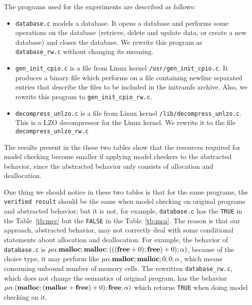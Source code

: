 The programs used for the experiments are described as follows:
\begin{itemize}
\item \texttt{database.c} models a database. It opens a database and
  performs some operations on the database (retrieve, delete and
  update data, or create a new database) and closes the database. We
  rewrite this program as \texttt{database\_rw.c} without changing its
  meaning.
\item \texttt{gen\_init\_cpio.c} is a file from Linux kernel
  \texttt{/usr/gen\_init\_cpio.c}. It produces a binary file which
  performs on a file containing newline separated entries that
  describe the files to be included in the initramfs archive. Also, we
  rewrite this program to \texttt{gen\_init\_cpio\_rw.c}.
  \item \texttt{decompress\_unlzo.c} is a file from Linux kernel
    \texttt{/lib/decompress\_unlzo.c}. This is a LZO decompressor for
    the Linux kernel. We rewrite it to the file
    \texttt{decompress\_unlzo\_rw.c}
\end{itemize}

The results present in the these two tables show that the
resources required for model checking become smaller if applying model
checkers to the abstracted behavior, since the abstracted behavior
only consists of allocation and deallocation.

One thing we should notice in these two tables is that for the same
programs, the \texttt{verified result} should be the same when model
checking on original programs and abstracted behavior; but it is not,
for example, \texttt{database.c} has the \texttt{TRUE} in the
Table~\ref{tb:mcc} but the \texttt{FALSE} in the
Table~\ref{tb:mca}. The reason is that our approach, abstracted
behavior, may not correctly deal with some conditional statements
about allocation and deallocation. For example, the behavior of
\texttt{database.c} is $\mu\alpha.\mathbf{malloc};\mathbf{malloc};(((\mathbf{free} + 0);\mathbf{free})
+ 0);\alpha)$, because of the choice type, it may perform like
$\mu\alpha.\mathbf{malloc};\mathbf{malloc};0;0;\alpha$, which means consuming unbound
number of memory cells. The rewritten \texttt{database\_rw.c}, which
does not change the semantics of original program, has the behavior
$\mu\alpha.(\mathbf{malloc};(\mathbf{malloc} + \mathbf{free}) + 0);\mathbf{free};\alpha)$ which
returns \texttt{TRUE} when doing model checking on it.


